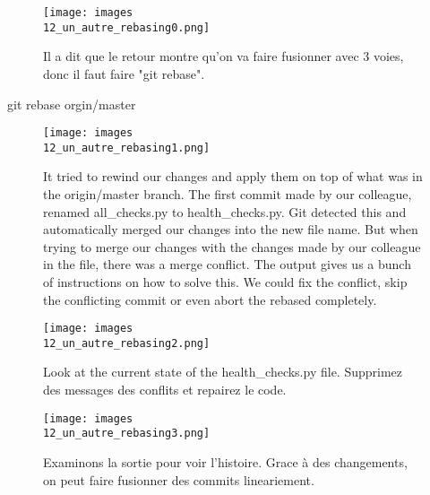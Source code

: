 \documentclass[11pt, onecolumn]{article}
\begin{document}
\begin{figure}[h]
\begin{center}
\texttt{[image: images\\12\_un\_autre\_rebasing0.png]}
\end{center}
\caption{Il a dit que le retour montre qu'on va faire fusionner avec 3 voies, donc il faut faire "git rebase".}
\label{12_un_autre_rebasing0}
\end{figure}

git rebase orgin/master

\begin{figure}[h]
\begin{center}
\texttt{[image: images\\12\_un\_autre\_rebasing1.png]}
\end{center}
\caption{It tried to rewind our changes and apply them on top of what was in the origin/master branch. The first commit made by our colleague, renamed all_checks.py to health_checks.py. Git detected this and automatically merged our changes into the new file name. But when trying to merge our changes with the changes made by our colleague in the file, there was a merge conflict. The output gives us a bunch of instructions on how to solve this. We could fix the conflict, skip the conflicting commit or even abort the rebased completely.}
\label{12_un_autre_rebasing1}
\end{figure}


\begin{figure}[h]
\begin{center}
\texttt{[image: images\\12\_un\_autre\_rebasing2.png]}
\end{center}
\caption{Look at the current state of the health_checks.py file. Supprimez des messages des conflits et repairez le code.}
\label{12_un_autre_rebasing2}
\end{figure}

\begin{figure}[h]
\begin{center}
\texttt{[image: images\\12\_un\_autre\_rebasing3.png]}
\end{center}
\caption{Examinons la sortie pour voir l'histoire. Grace à des changements, on peut faire fusionner des commits lineariement.}
\label{12_un_autre_rebasing3}
\end{figure}
\end{document}
